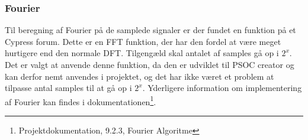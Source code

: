 
\subsubsection{Fourier}

Til beregning af Fourier på de samplede signaler er der fundet en funktion på et Cypress forum\cite{FFTalgo}. Dette er en FFT funktion, der har den fordel at være meget hurtigere end den normale DFT. Tilgengæld skal antalet af samples gå op i $2^{x}$. Det er valgt at anvende denne funktion, da den er udviklet til PSOC creator og kan derfor nemt anvendes i projektet, og det har ikke været et problem at tilpasse antal samples til at gå op i $2^{x}$. Yderligere information om implementering af Fourier kan findes i dokumentationen\footnote{Projektdokumentation, 9.2.3, Fourier Algoritme}. 